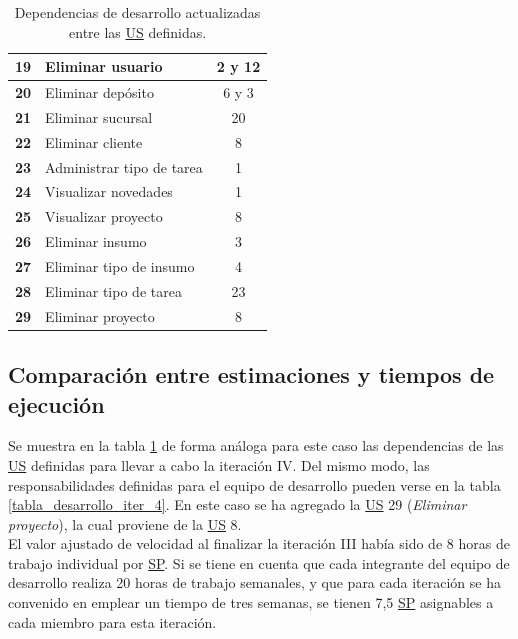 \documentclass[a4paper, 12pt,twoside]{report}  %
\numberwithin{equation}{subsection} %
\begin{document}
\begin{table}[h!]
\begin{tabular}{ |p{0.5cm}|p{9cm}|c|  }
		\hline
		\textbf{19} & Eliminar usuario & 2 y 12 \\
		\hline
		\textbf{20} & Eliminar depósito & 6 y 3 \\
		\hline
		\textbf{21} & Eliminar sucursal & 20 \\
		\hline
		\textbf{22} & Eliminar cliente & 8 \\
		\hline
		\textbf{23} & \cellcolor{marca_US_realizada_anterior}Administrar tipo de tarea & 1 
		\\
		\hline
		\textbf{24} & \cellcolor{marca_US_realizada_anterior}Visualizar novedades & 1 
		\\
		\hline
		\textbf{25} & \cellcolor{marca_US_realizada}Visualizar proyecto & 8 
		\\
		\hline
		\textbf{26} & Eliminar insumo & 3 
		\\
		\hline
		\textbf{27} & Eliminar tipo de insumo & 4 
		\\
		\hline
		\textbf{28} & Eliminar tipo de tarea & 23 
		\\
		\hline
		\textbf{29} & Eliminar proyecto & 8 
		\\
		\hline
	\end{tabular}
	\caption{Dependencias de desarrollo actualizadas entre las \protect\hyperlink{US}{US} definidas.}
	\label{tabla_dependencias_us_it4}
\end{table}

\subsection{Comparación entre estimaciones y tiempos de ejecución}
Se muestra en la tabla \ref{tabla_dependencias_us_it4} de forma análoga para este caso las dependencias de las \hyperlink{US}{US} definidas para llevar a cabo la iteración IV. Del mismo modo, las responsabilidades definidas para el equipo de desarrollo pueden verse en la tabla \ref{tabla_desarrollo_iter_4}. En este caso se ha agregado la \hyperlink{US}{US} 29 (\textit{Eliminar proyecto}), la cual proviene de la \hyperlink{US}{US} 8.\\
\indent El valor ajustado de velocidad al finalizar la iteración III había sido de 8 horas de trabajo individual por \hyperlink{SP}{SP}. Si se tiene en cuenta que cada integrante del equipo de desarrollo realiza 20 horas de trabajo semanales, y que para cada iteración se ha convenido en emplear un tiempo de tres semanas, se tienen 7,5 \hyperlink{SP}{SP} asignables a cada miembro para esta iteración.
\end{document}
